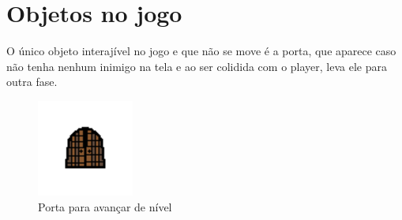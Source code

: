 \documentclass[a4paper]{scrreprt}
\begin{document}
    \section{Objetos no jogo}
        O único objeto interajível no jogo e que não se move é a porta, que aparece caso não tenha nenhum inimigo na tela e ao ser colidida com o player, leva ele para outra fase.
        
        \begin{figure}[H]
            \centering
            \includegraphics[width=.6\linewidth]{porta.png}
            \caption{Porta para avançar de nível}
            \label{fig:arena}
        \end{figure}
\end{document}
